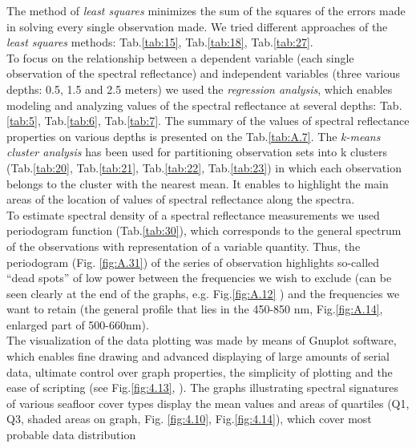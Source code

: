 \documentclass[11pt]{article}
\begin{document}
The method of \textit{least squares} minimizes the sum of the squares of the errors made in solving every single observation made. We tried different approaches of the \textit{least squares} methods: Tab.\ref{tab:15}, Tab.\ref{tab:18}, Tab.\ref{tab:27}.\\
To focus on the relationship between a dependent variable (each single observation of the spectral reflectance) and independent variables (three various depths: 0.5, 1.5 and 2.5 meters) we used the \textit{regression analysis}, which enables modeling and analyzing values of the spectral reflectance at several depths: Tab.\ref{tab:5}, Tab.\ref{tab:6}, Tab.\ref{tab:7}. 
The summary of the values of spectral reflectance properties on various depths is presented on the Tab.\ref{tab:A.7}.
The \textit{k-means cluster analysis} has been used for partitioning observation sets into k clusters (Tab.\ref{tab:20}, Tab.\ref{tab:21}, Tab.\ref{tab:22}, Tab.\ref{tab:23}) in which each observation belongs to the cluster with the nearest mean.
It enables to highlight the main areas of the location of values of spectral reflectance along the spectra.\\
To estimate spectral density of a spectral reflectance measurements we used periodogram function (Tab.\ref{tab:30}), 
which corresponds to the general spectrum of the observations with representation of a variable quantity.  
Thus, the periodogram (Fig. \ref{fig:A.31}) of the series of observation highlights so-called “dead spots” of low power between the frequencies we wish to
exclude (can be seen clearly at the end of the graphs, e.g. Fig.\ref{fig:A.12} ) 
and the frequencies we want to retain (the general profile that lies in the 450-850 nm, Fig.\ref{fig:A.14}, enlarged part of 500-660nm).\\
The visualization of the data plotting was made by means of Gnuplot software, which enables fine
drawing and advanced displaying of large amounts of serial data, ultimate control over graph properties, 
the simplicity of plotting and the ease of scripting (see Fig.\ref{fig:4.13}, ).
The graphs illustrating spectral signatures of various seafloor cover types display the mean values and
areas of quartiles (Q1, Q3, shaded areas on graph, Fig. \ref{fig:4.10}, Fig.\ref{fig:4.14}), which cover most probable data distribution
\end{document}
